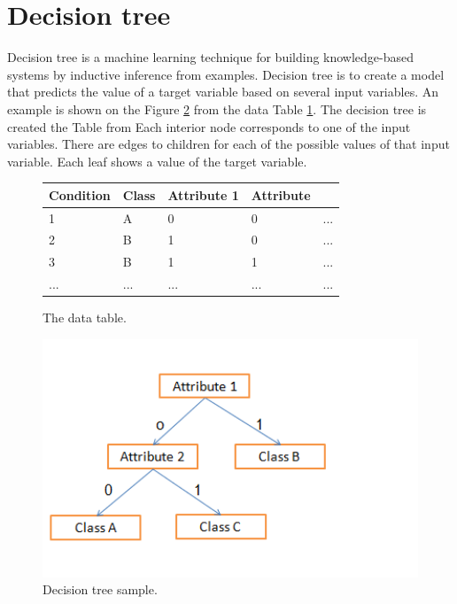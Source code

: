 \section{Decision tree\cite{decisiontree}}

Decision tree is a machine learning technique for building knowledge-based systems by inductive inference from examples. Decision tree is to create a model that predicts the value of a target variable based on several input variables. An example is shown on the Figure \ref{fig:decisiontreesample} from the data Table \ref{fig:decisiontreesampletable}. The decision tree is created the Table from Each interior node corresponds to one of the input variables. There are edges to children for each of the possible values of that input variable. Each leaf shows a value of the target variable.
\begin{figure}[h!]
  \begin{center}
    \begin{tabular}{ | l | l | l | l | l }
     \hline
    Condition & Class & Attribute 1 &  Attribute \\ \hline
    1 & A & 0 & 0 & ... \\ 
	2 & B & 1 & 0 & ... \\ 
	3 & B & 1 & 1 & ... \\ 
	... & ... & ... & ... & ... \\ 


    \end{tabular}
	\end{center}
     \caption{The data table.}
    \label{fig:decisiontreesampletable}
\end{figure} 
\begin{figure}[httb]
\centering
\includegraphics[width=1\textwidth]{graph/decisiontreesample.png}
\caption{Decision tree sample.}
\label{fig:decisiontreesample}
\end{figure}

